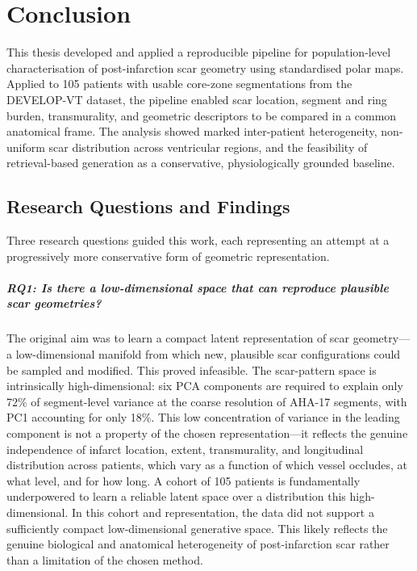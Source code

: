 \chapter*{Conclusion}

This thesis developed and applied a reproducible pipeline for population-level
characterisation of post-infarction scar geometry using standardised polar maps. Applied to
105 patients with usable core-zone segmentations from the DEVELOP-VT dataset, the
pipeline enabled scar location, segment and ring burden, transmurality, and geometric
descriptors to be compared in a common anatomical frame. The analysis showed marked
inter-patient heterogeneity, non-uniform scar distribution across ventricular regions, and the
feasibility of retrieval-based generation as a conservative, physiologically grounded baseline.

\section*{Research Questions and Findings}

Three research questions guided this work, each representing an attempt at a progressively
more conservative form of geometric representation.

\paragraph{RQ1: Is there a low-dimensional space that can reproduce plausible scar geometries?}

The original aim was to learn a compact latent representation of scar geometry---a
low-dimensional manifold from which new, plausible scar configurations could be sampled
and modified. This proved infeasible. The scar-pattern space is intrinsically high-dimensional:
six PCA components are required to explain only 72\% of segment-level variance at the
coarse resolution of AHA-17 segments, with PC1 accounting for only 18\%. This low
concentration of variance in the leading component is not a property of the chosen
representation---it reflects the genuine independence of infarct location, extent,
transmurality, and longitudinal distribution across patients, which vary as a function of which
vessel occludes, at what level, and for how long. A cohort of 105 patients is fundamentally
underpowered to learn a reliable latent space over a distribution this high-dimensional. In
this cohort and representation, the data did not support a sufficiently compact
low-dimensional generative space. This likely reflects the genuine biological and anatomical
heterogeneity of post-infarction scar rather than a limitation of the chosen method.

